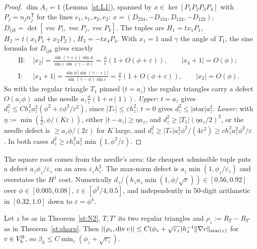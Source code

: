 \begin{proof}
$\dim A_z=1$ (Lemma~\ref{st:L1}), spanned by $x\in\ker[P_1P_2P_3P_4]$ with $P_j=n_jn_j^{\mathsf T}$ for the lines $e_1,s_1,s_2,e_2$: $x=(D_{234},-D_{134},D_{124},-D_{123})$, $D_{ijk}=\det[\operatorname{vec}P_i,\operatorname{vec}P_j,\operatorname{vec}P_k]$. The tuples are $H_1=tx_1P_1$, $H_2=t(x_1P_1+x_2P_2)$, $H_3=-tx_4P_4$. With $x_1=1$ and $\gamma$ the angle of $T_1$, the sine formula for $D_{ijk}$ gives exactly
\begin{align*}
\text{II: }&|x_2|=\frac{\sin(\gamma+\varepsilon)\sin\phi}{\sin\varepsilon\,\sin(\gamma-\phi)}=\frac\phi\varepsilon(1+O(\phi+\varepsilon)),\qquad |x_4+1|=O(\phi);\\
\text{I: }&|x_4+1|=\frac{\sin\phi\,|\sin(\gamma-\varepsilon)|}{\sin(\gamma-\phi)\sin\varepsilon}=\frac\phi\varepsilon(1+O(\phi+\varepsilon)),\qquad |x_2|=O(\phi).
\end{align*}
So with the regular triangle $T_1$ pinned ($t=a_z$) the regular triangles carry a defect $O(a_z\phi)$ and the needle $a_z\frac\phi\varepsilon(1+o(1))$. \emph{Upper:} $t=a_z$ gives $d_z^2\le Ch_z^2a_z^2(\phi^2+\varepsilon\phi^2/\varepsilon^2)$, since $|T_\ast|\le\varepsilon h_z^2$; $t=0$ gives $d_z^2\le|\text{star}|a_z^2$. \emph{Lower:} with $\eta:=\min(\frac12,\phi/(K\varepsilon))$, either $|t-a_z|\ge\eta a_z$, and $d_z^2\ge|T_1|(\eta a_z/2)^2$, or the needle defect is $\ge a_z\phi/(2\varepsilon)$ for $K$ large, and $d_z^2\ge|T_\ast|a_z^2\phi^2/(4\varepsilon^2)\ge ch_z^2a_z^2\phi^2/\varepsilon$. In both cases $d_z^2\ge ch_z^2a_z^2\min(1,\phi^2/\varepsilon)$.
\end{proof}

The square root comes from the needle's area: the cheapest admissible tuple puts a defect $a_z\phi_z/\varepsilon_z$ on an area $\varepsilon_zh_z^2$. The max-norm defect is $a_z\min(1,\phi_z/\varepsilon_z)$ and overstates the $H^1$ cost. Numerically $d_z/(h_za_z\min(1,\phi/\sqrt\varepsilon))\in[0.56,0.92]$ over $\phi\in[0.005,0.08]$, $\varepsilon\in[\phi^2/4,0.5]$, and independently in 50-digit arithmetic in $[0.32,1.0]$ down to $\varepsilon=\phi^4$.

\begin{proposition}\label{st:N4}
Let $z$ be as in Theorem~\ref{st:N2}, $T,T'$ its two regular triangles and $\rho_z:=R_T-R_{T'}$ as in Theorem~\ref{st:sharp}. Then $|(\rho_z,\operatorname{div} v)|\le C(\phi_z+\sqrt{\varepsilon_z})h_z^{-1}\lVert \nabla v\rVert_{\text{star}(z)}$ for $v\in V_h^0$, so $\beta_h\le C\min_z(\phi_z+\sqrt{\varepsilon_z})$.
\end{proposition}

